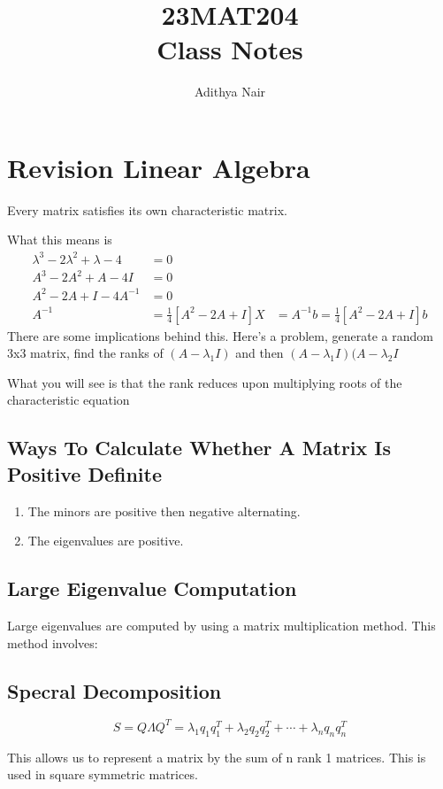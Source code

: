 \documentclass[twoside]{report}
\title{\Huge{23MAT204}\\ Class Notes}
\author{\huge{Adithya Nair}}
\date{}
\begin{document}
\maketitle
\chapter{Revision Linear Algebra}
\begin{theorem}
	Every matrix satisfies its own characteristic matrix.
\end{theorem}
What this means is
\begin{align*}
	\lambda^3 - 2\lambda^2 + \lambda -4 &= 0 \\	
	A^3 - 2A^2 + A -4I &= 0 \\	
	A^2 - 2A + I - 4A^{-1} &= 0 \\
	A^{-1} &= \frac{1}{4}[A^2 - 2A + I]
	X &= A^{-1}b = \frac{1}{4}[A^2 - 2A + I]b
\end{align*}
There are some implications behind this.
Here's a problem,
generate a random 3x3 matrix, find the ranks of $(A- \lambda_1 I)$ and then $(A-\lambda_1 I)(A-\lambda_2 I$

What you will see is that the rank reduces upon multiplying roots of the characteristic equation

\section{Ways To Calculate Whether A Matrix Is Positive Definite}
\begin{enumerate}
	\item The minors are positive then negative alternating.
	\item The eigenvalues are positive.
\end{enumerate}
\section{Large Eigenvalue Computation}
Large eigenvalues are computed by using a matrix multiplication method. This method involves:

\section{Specral Decomposition}
\[
	S = Q \Lambda Q^T = \lambda_1 q_1 q_1^T + \lambda_2 q_2 q_2^T + \cdots + \lambda_n q_n q_n^T
\]

This allows us to represent a matrix by the sum of n rank 1 matrices. This is used in square symmetric matrices.
\end{document}

